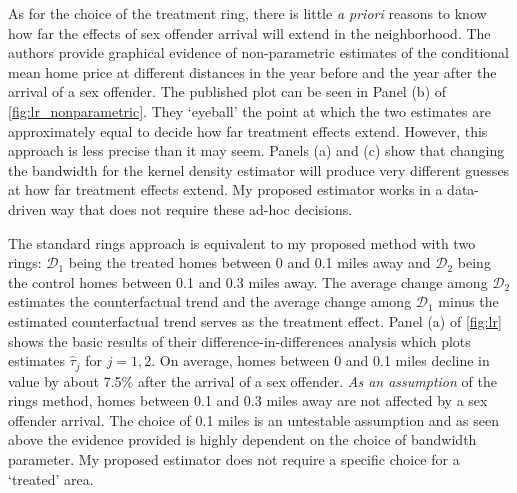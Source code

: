 \documentclass[10pt]{article}
\begin{document}
As for the choice of the treatment ring, there is little \emph{a priori} reasons to know how far the effects of sex offender arrival will extend in the neighborhood. The authors provide graphical evidence of non-parametric estimates of the conditional mean home price at different distances in the year before and the year after the arrival of a sex offender. The published plot can be seen in Panel (b) of \autoref{fig:lr_nonparametric}. They `eyeball' the point at which the two estimates are approximately equal to decide how far treatment effects extend. However, this approach is less precise than it may seem. Panels (a) and (c) show that changing the bandwidth for the kernel density estimator will produce very different guesses at how far treatment effects extend. My proposed estimator works in a data-driven way that does not require these ad-hoc decisions.

The standard rings approach is equivalent to my proposed method with two rings: $\mathcal{D}_1$ being the treated homes between 0 and 0.1 miles away and $\mathcal{D}_2$ being the control homes between 0.1 and 0.3 miles away. The average change among $\mathcal{D}_2$ estimates the counterfactual trend and the average change among $\mathcal{D}_1$ minus the estimated counterfactual trend serves as the treatment effect. Panel (a) of \autoref{fig:lr} shows the basic results of their difference-in-differences analysis which plots estimates $\hat{\tau}_j$ for $j = 1,2$.  On average, homes between 0 and 0.1 miles decline in value by about 7.5\% after the arrival of a sex offender. \emph{As an assumption} of the rings method, homes between 0.1 and 0.3 miles away are not affected by a sex offender arrival. The choice of 0.1 miles is an untestable assumption and as seen above the evidence provided is highly dependent on the choice of bandwidth parameter. My proposed estimator does not require a specific choice for a `treated' area.
\end{document}
